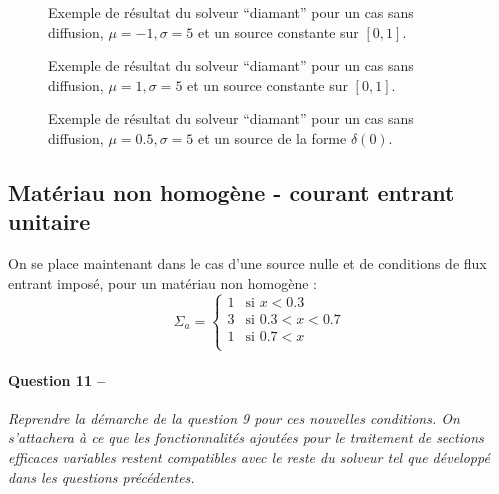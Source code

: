 \documentclass[11pt,a4paper]{article}
\newcommand{\question}[2]{\paragraph{Question #1 --}\hspace{-7pt}\textit{#2} \\}
\begin{document}
\begin{figure}
  \centering
  
  \caption{Exemple de résultat du solveur ``diamant'' pour un cas sans diffusion, $\mu=-1, \sigma=5$ et un source constante sur $[0,1]$.}
  \label{fig:exple_a}
\end{figure}

\begin{figure}
  \centering
  
  \caption{Exemple de résultat du solveur ``diamant'' pour un cas sans diffusion, $\mu=1, \sigma=5$ et un source constante sur $[0,1]$.}
  \label{fig:exple_b}
\end{figure}

\begin{figure}
  \centering
  
  \caption{Exemple de résultat du solveur ``diamant'' pour un cas sans diffusion, $\mu=0.5, \sigma=5$ et un source de la forme $\delta(0)$.}
  \label{fig:exple_c}
\end{figure}


 \subsection{Matériau non homogène - courant entrant unitaire}
 
 On se place maintenant dans le cas d'une source nulle et de conditions de flux entrant imposé, pour un matériau non homogène :
\begin{equation}
  \Sigma_a =
  \begin{cases}
    1 &\mbox{si } x<0.3 \\
    3 &\mbox{si } 0.3<x<0.7 \\
    1 &\mbox{si } 0.7<x \\
  \end{cases}
\end{equation}

\question{11}{Reprendre la démarche de la question 9 pour ces nouvelles conditions.
  On s'attachera à ce que les fonctionnalités ajoutées pour le traitement de sections efficaces variables restent compatibles avec le reste du solveur tel que développé dans les questions précédentes.}
\end{document}
